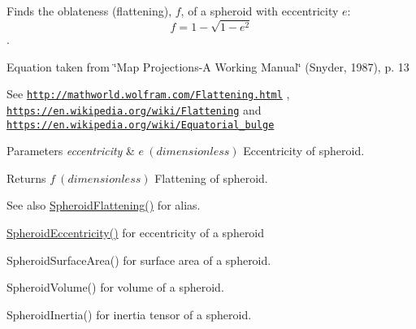 Finds the oblateness (flattening), $f$, of a spheroid with eccentricity $e$\+: \[ f = 1 - \sqrt{1-e^2} \]. 

Equation taken from \char`\"{}\+Map Projections-\/\+A Working Manual\char`\"{} (Snyder, 1987), p. 13

See \href{http://mathworld.wolfram.com/Flattening.html}{\tt http\+://mathworld.\+wolfram.\+com/\+Flattening.\+html} , \href{https://en.wikipedia.org/wiki/Flattening}{\tt https\+://en.\+wikipedia.\+org/wiki/\+Flattening} and \href{https://en.wikipedia.org/wiki/Equatorial_bulge}{\tt https\+://en.\+wikipedia.\+org/wiki/\+Equatorial\+\_\+bulge} 
\begin{DoxyParams}{Parameters}
{\em eccentricity} & $ e\ (dimensionless)$ Eccentricity of spheroid. \\
\hline
\end{DoxyParams}
\begin{DoxyReturn}{Returns}
$ f\ (dimensionless)$ Flattening of spheroid. 
\end{DoxyReturn}
\begin{DoxySeeAlso}{See also}
\mbox{\hyperlink{group___e_g_x_math-_geometry-3_d-_spheroid-_flattening_ga9822b6e1025edbf7d272949547c53511}{Spheroid\+Flattening()}} for alias. 

\mbox{\hyperlink{group___e_g_x_math-_geometry-3_d-_spheroid-_eccentricity_gab45680528a41bb7a5e15ddc0059156dd}{Spheroid\+Eccentricity()}} for eccentricity of a spheroid 

Spheroid\+Surface\+Area() for surface area of a spheroid. 

Spheroid\+Volume() for volume of a spheroid. 

Spheroid\+Inertia() for inertia tensor of a spheroid. 
\end{DoxySeeAlso}
